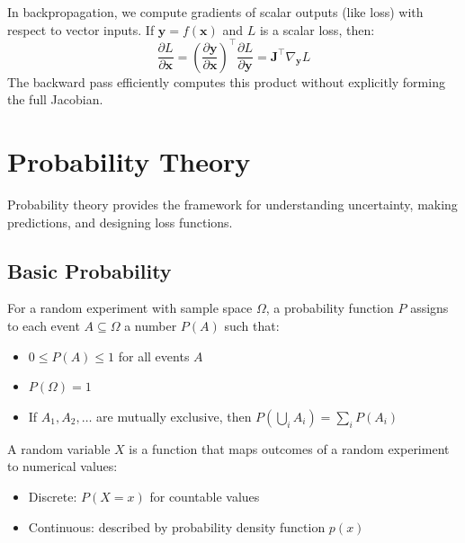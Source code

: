 \begin{example}
In backpropagation, we compute gradients of scalar outputs (like loss) with respect to vector inputs. If $\mathbf{y} = f(\mathbf{x})$ and $L$ is a scalar loss, then:
\begin{equation}
\frac{\partial L}{\partial \mathbf{x}} = \left(\frac{\partial \mathbf{y}}{\partial \mathbf{x}}\right)^\top \frac{\partial L}{\partial \mathbf{y}} = \mathbf{J}^\top \nabla_{\mathbf{y}} L
\end{equation}
The backward pass efficiently computes this product without explicitly forming the full Jacobian.
\end{example}

\section{Probability Theory}

Probability theory provides the framework for understanding uncertainty, making predictions, and designing loss functions.

\subsection{Basic Probability}

\begin{definition}[Probability]
For a random experiment with sample space $\Omega$, a probability function $P$ assigns to each event $A \subseteq \Omega$ a number $P(A)$ such that:
\begin{itemize}
    \item $0 \leq P(A) \leq 1$ for all events $A$
    \item $P(\Omega) = 1$
    \item If $A_1, A_2, \ldots$ are mutually exclusive, then $P(\bigcup_i A_i) = \sum_i P(A_i)$
\end{itemize}
\end{definition}

\begin{definition}
A random variable $X$ is a function that maps outcomes of a random experiment to numerical values:
\begin{itemize}
    \item Discrete: $P(X = x)$ for countable values
    \item Continuous: described by probability density function $p(x)$
\end{itemize}
\end{definition}

